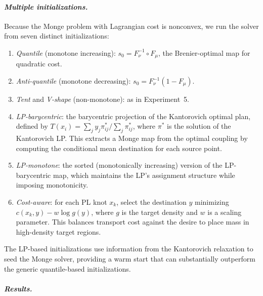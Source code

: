 \documentclass[12pt,leqno]{amsart}
\begin{document}
\paragraph{\it Multiple initializations.}
Because the Monge problem with Lagrangian cost is nonconvex, we run the solver from seven distinct initializations:
\begin{enumerate}
    \item \emph{Quantile} (monotone increasing): $s_0 = F_\nu^{-1} \circ F_\mu$, the Brenier-optimal map for quadratic cost.
    \item \emph{Anti-quantile} (monotone decreasing): $s_0 = F_\nu^{-1}(1 - F_\mu)$.
    \item \emph{Tent} and \emph{V-shape} (non-monotone): as in Experiment~5.
    \item \emph{LP-barycentric}: the barycentric projection of the Kantorovich optimal plan, defined by $T(x_i) = \sum_j y_j \pi^*_{ij} / \sum_j \pi^*_{ij}$, where $\pi^*$ is the solution of the Kantorovich LP. This extracts a Monge map from the optimal coupling by computing the conditional mean destination for each source point.
    \item \emph{LP-monotone}: the sorted (monotonically increasing) version of the LP-barycentric map, which maintains the LP's assignment structure while imposing monotonicity.
    \item \emph{Cost-aware}: for each PL knot $x_k$, select the destination $y$ minimizing $c(x_k, y) - w \log g(y)$, where $g$ is the target density and $w$ is a scaling parameter. This balances transport cost against the desire to place mass in high-density target regions.
\end{enumerate}
The LP-based initializations use information from the Kantorovich relaxation to seed the Monge solver, providing a warm start that can substantially outperform the generic quantile-based initializations.

\paragraph{\it Results.}
\end{document}
